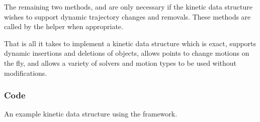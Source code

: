 The remaining two methods,  and  are only
necessary if the kinetic data structure wishes to support dynamic
trajectory changes and removals. These methods are called by the
 helper when appropriate.

That is all it takes to implement a kinetic data structure which is
exact, supports dynamic insertions and deletions of objects, allows
points to change motions on the fly, and allows a variety of solvers
and motion types to be used without modifications.

\subsubsection{Code}
\label{fig:example_program}
An example kinetic data structure using the framework.  
